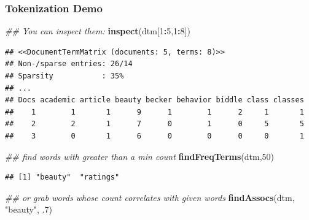 \documentclass[
  shownotes,
  xcolor={svgnames},
  hyperref={colorlinks,citecolor=DarkBlue,linkcolor=DarkRed,urlcolor=DarkBlue}
  , aspectratio=169]{beamer}
\newenvironment{Shaded}{\begin{snugshade}}{\end{snugshade}}
\newcommand{\CommentTok}[1]{\textcolor[rgb]{0.56,0.35,0.01}{\textit{#1}}}
\newcommand{\DecValTok}[1]{\textcolor[rgb]{0.00,0.00,0.81}{#1}}
\newcommand{\FloatTok}[1]{\textcolor[rgb]{0.00,0.00,0.81}{#1}}
\newcommand{\KeywordTok}[1]{\textcolor[rgb]{0.13,0.29,0.53}{\textbf{#1}}}
\newcommand{\NormalTok}[1]{#1}
\newcommand{\OperatorTok}[1]{\textcolor[rgb]{0.81,0.36,0.00}{\textbf{#1}}}
\newcommand{\StringTok}[1]{\textcolor[rgb]{0.31,0.60,0.02}{#1}}
\begin{document}
\begin{frame}[fragile]
\frametitle{Tokenization Demo}

\begin{scriptsize}


\begin{Shaded}
\begin{Highlighting}[]
\CommentTok{\#\# You can inspect them:}
\KeywordTok{inspect}\NormalTok{(dtm[}\DecValTok{1}\OperatorTok{:}\DecValTok{5}\NormalTok{,}\DecValTok{1}\OperatorTok{:}\DecValTok{8}\NormalTok{])}
\end{Highlighting}
\end{Shaded}
\end{scriptsize}
\begin{tiny}

\begin{verbatim}
## <<DocumentTermMatrix (documents: 5, terms: 8)>>
## Non-/sparse entries: 26/14
## Sparsity           : 35%
## ...
## Docs academic article beauty becker behavior biddle class classes
##    1        1       1      9      1        1      2     1       1
##    2        2       1      7      0        1      0     5       5
##    3        0       1      6      0        0      0     0       1
\end{verbatim}

\end{tiny}

\begin{scriptsize}
\begin{Shaded}
\begin{Highlighting}[]
\CommentTok{\#\# find words with greater than a min count}
\KeywordTok{findFreqTerms}\NormalTok{(dtm,}\DecValTok{50}\NormalTok{)}
\end{Highlighting}
\end{Shaded}

\end{scriptsize}
\begin{tiny}

\begin{verbatim}
## [1] "beauty"  "ratings"
\end{verbatim}

\end{tiny}
\begin{scriptsize}


\begin{Shaded}
\begin{Highlighting}[]
\CommentTok{\#\# or grab words whose count correlates with given words}
\KeywordTok{findAssocs}\NormalTok{(dtm, }\StringTok{"beauty"}\NormalTok{, }\FloatTok{.7}\NormalTok{) }
\end{Highlighting}
\end{Shaded}
\end{scriptsize}
\begin{tiny}



\end{tiny}
\end{frame}
\end{document}
